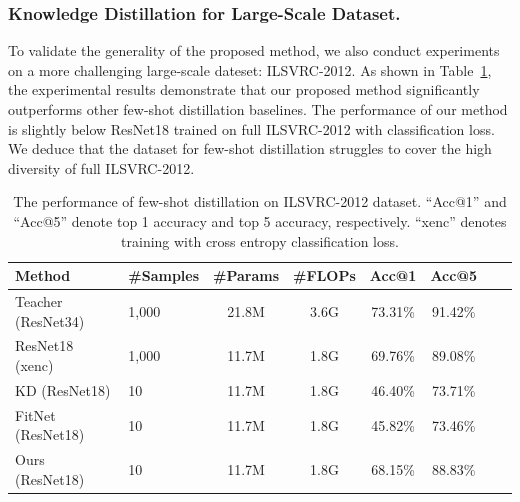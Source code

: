 \documentclass[letterpaper]{article} %
\begin{document}
{{{        \subsubsection{Knowledge Distillation for Large-Scale Dataset.}
        To validate the generality of the proposed method, we also conduct experiments on a more challenging large-scale dateset: ILSVRC-2012. 
        As shown in Table~\ref{table:imagenet}, the experimental results demonstrate that our proposed method significantly outperforms other few-shot distillation baselines. 
        The performance of our method is slightly below ResNet18 trained on full ILSVRC-2012 with classification loss. 
        We deduce that the dataset for few-shot distillation struggles to cover the high diversity of full ILSVRC-2012.
        
        \begin{table}[ht]
        \centering
        \resizebox{\linewidth}{!}
        {
            \begin{tabular}{llcccccc}
            \toprule
            \textbf{Method} & \textbf{\#Samples} & \textbf{\#Params} & \textbf{\#FLOPs} & \textbf{Acc@1} & \textbf{Acc@5}\\ 
            \hline
            Teacher (ResNet34)  
                                & 1,000           & 21.8M         & 3.6G     & 73.31\%        &  91.42\%    \\
            ResNet18 (xenc)   
                                & 1,000           & 11.7M         & 1.8G     & 69.76\%        &  89.08\%    \\
            \hline
            KD (ResNet18)
                                & 10              & 11.7M         & 1.8G     & 46.40\%        &  73.71\%   \\
            FitNet (ResNet18)  
                                & 10              & 11.7M         & 1.8G     & 45.82\%        &  73.46\%   \\
            Ours (ResNet18)
                                & 10              & 11.7M         & 1.8G     & 68.15\%        &  88.83\%   \\
            \bottomrule
            \end{tabular}   

        }
        \caption{The performance of few-shot distillation on ILSVRC-2012 dataset. 
        ``Acc@1'' and ``Acc@5'' denote top 1 accuracy and top 5 accuracy, respectively.
        ``xenc'' denotes training with cross entropy classification loss.}
        \label{table:imagenet}
        \end{table}
        }

}}
\end{document}
